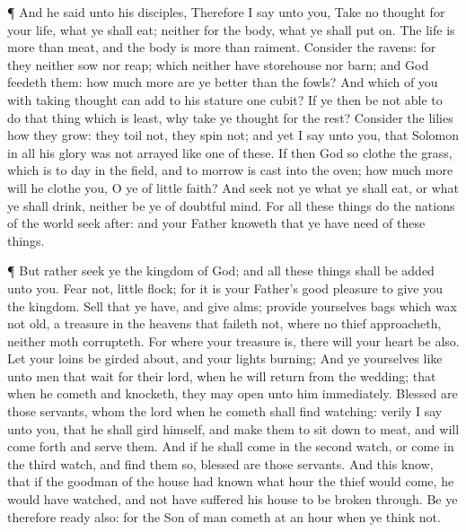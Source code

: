  ¶ And he said unto his disciples, Therefore I say unto
you, Take no thought for your life, what ye shall eat; neither for the
body, what ye shall put on.  The life is more than meat,
and the body is more than raiment.  Consider the ravens:
for they neither sow nor reap; which neither have storehouse nor barn;
and God feedeth them: how much more are ye better than the fowls?
 And which of you with taking thought can add to his
stature one cubit?  If ye then be not able to do that thing
which is least, why take ye thought for the rest?  Consider
the lilies how they grow: they toil not, they spin not; and yet I say
unto you, that Solomon in all his glory was not arrayed like one of
these.  If then God so clothe the grass, which is to day in
the field, and to morrow is cast into the oven; how much more will he
clothe you, O ye of little faith?  And seek not ye what ye
shall eat, or what ye shall drink, neither be ye of doubtful mind.
 For all these things do the nations of the world seek
after: and your Father knoweth that ye have need of these things.

 ¶ But rather seek ye the kingdom of God; and all these
things shall be added unto you.  Fear not, little flock;
for it is your Father's good pleasure to give you the kingdom.
 Sell that ye have, and give alms; provide yourselves bags
which wax not old, a treasure in the heavens that faileth not, where no
thief approacheth, neither moth corrupteth.  For where your
treasure is, there will your heart be also.  Let your loins
be girded about, and your lights burning;  And ye
yourselves like unto men that wait for their lord, when he will return
from the wedding; that when he cometh and knocketh, they may open unto
him immediately.  Blessed are those servants, whom the lord
when he cometh shall find watching: verily I say unto you, that he shall
gird himself, and make them to sit down to meat, and will come forth and
serve them.  And if he shall come in the second watch, or
come in the third watch, and find them so, blessed are those servants.
 And this know, that if the goodman of the house had known
what hour the thief would come, he would have watched, and not have
suffered his house to be broken through.  Be ye therefore
ready also: for the Son of man cometh at an hour when ye think not.

